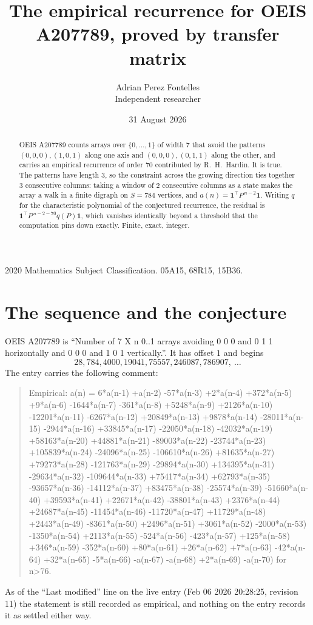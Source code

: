 \documentclass[11pt,a4paper]{article}
\title{The empirical recurrence for OEIS A207789, proved by transfer matrix}
\author{Adrian Perez Fontelles\\ \small Independent researcher}
\date{31 August 2026}
\theoremstyle{plain}
\theoremstyle{definition}
\begin{document}
\maketitle

\begin{abstract}
OEIS A207789 counts arrays over $\{0,\dots,1\}$ of width $7$ that avoid the patterns
$(0,0,0), (1,0,1)$ along one axis and $(0,0,0), (0,1,1)$ along the other, and carries an empirical recurrence of
order $70$ contributed by R.~H.~Hardin. It is true. The patterns have length $3$, so
the constraint across the growing direction ties together $3$ consecutive columns: taking a
window of $2$ consecutive columns as a state makes the array a walk in a finite digraph
on $S=784$ vertices, and $a(n)=\mathbf{1}^{\!\top}P^{\,n-2}\mathbf{1}$. Writing $q$
for the characteristic polynomial of the conjectured recurrence, the residual is
$\mathbf{1}^{\!\top}P^{\,n-2-70}q(P)\mathbf{1}$, which vanishes identically
beyond a threshold that the computation pins down exactly. Finite, exact, integer.
\end{abstract}

\noindent\small 2020 Mathematics Subject Classification. 05A15, 68R15, 15B36.\normalsize

\section{The sequence and the conjecture}

OEIS A207789 is ``Number of 7 X n 0..1 arrays avoiding 0 0 0 and 0 1 1 horizontally and 0 0 0 and 1 0 1 vertically.''. It has offset
$1$ and begins
\[
28, 784, 4000, 19041, 75557, 246087, 786907,\ \dots
\]
The entry carries the following comment:
\begin{quote}\small
Empirical: a(n) = 6*a(n-1) +a(n-2) -57*a(n-3) +2*a(n-4) +372*a(n-5) +9*a(n-6) -1644*a(n-7) -361*a(n-8) +5248*a(n-9) +2126*a(n-10) -12201*a(n-11) -6267*a(n-12) +20849*a(n-13) +9878*a(n-14) -28011*a(n-15) -2944*a(n-16) +33845*a(n-17) -22050*a(n-18) -42032*a(n-19) +58163*a(n-20) +44881*a(n-21) -89003*a(n-22) -23744*a(n-23) +105839*a(n-24) -24096*a(n-25) -106610*a(n-26) +81635*a(n-27) +79273*a(n-28) -121763*a(n-29) -29894*a(n-30) +134395*a(n-31) -29634*a(n-32) -109644*a(n-33) +75417*a(n-34) +62793*a(n-35) -93657*a(n-36) -14112*a(n-37) +83475*a(n-38) -25574*a(n-39) -51660*a(n-40) +39593*a(n-41) +22671*a(n-42) -38801*a(n-43) +2376*a(n-44) +24687*a(n-45) -11454*a(n-46) -11720*a(n-47) +11729*a(n-48) +2443*a(n-49) -8361*a(n-50) +2496*a(n-51) +3061*a(n-52) -2000*a(n-53) -1350*a(n-54) +2113*a(n-55) -524*a(n-56) -423*a(n-57) +125*a(n-58) +346*a(n-59) -352*a(n-60) +80*a(n-61) +26*a(n-62) +7*a(n-63) -42*a(n-64) +32*a(n-65) -5*a(n-66) -a(n-67) -a(n-68) +2*a(n-69) -a(n-70) for n>76.
\end{quote}
As of the ``Last modified'' line on the live entry (Feb 06 2026 20:28:25, revision
11) the statement is still recorded as empirical, and nothing on the entry
records it as settled either way.
\end{document}
